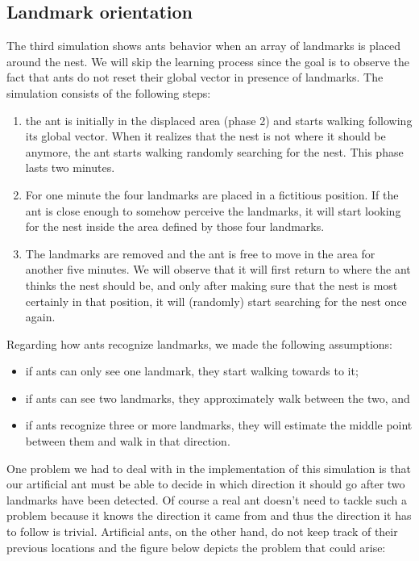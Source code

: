 \documentclass[11pt]{article}
\begin{document}
\subsection{Landmark orientation}

The third simulation shows ants behavior when an array of landmarks is placed around the nest. We will skip the learning process since the goal is to observe the fact that ants do not reset their global vector in presence of landmarks. The simulation consists of the following steps:

\begin{enumerate}
\item the ant is initially in the displaced area (phase 2) and starts walking following its global vector. When it realizes that the nest is not where it should be anymore, the ant starts walking randomly searching for the nest. This phase lasts two minutes.
\item For one minute the four landmarks are placed in a fictitious position. If the ant is close enough to somehow perceive the landmarks, it will start looking for the nest inside the area defined by those four landmarks.
\item The landmarks are removed and the ant is free to move in the area for another five minutes. We will observe that it will first return to where the ant thinks the nest should be, and only after making sure that the nest is most certainly in that position, it will (randomly) start searching for the nest once again.
\end{enumerate}

Regarding how ants recognize landmarks, we made the following assumptions:
\begin{itemize}
\item if ants can only see one landmark, they start walking towards to it;
\item if ants can see two landmarks, they approximately walk between the two, and
\item if ants recognize three or more landmarks, they will estimate the middle point between them and walk in that direction.
\end{itemize}

One problem we had to deal with in the implementation of this simulation is that our artificial ant must be able to decide in which direction it should go after two landmarks have been detected. Of course a real ant doesn't need to tackle such a problem because it knows the direction it came from and thus the direction it has to follow is trivial. Artificial ants, on the other hand, do not keep track of their previous locations and the figure below depicts the problem that could arise:
\end{document}
